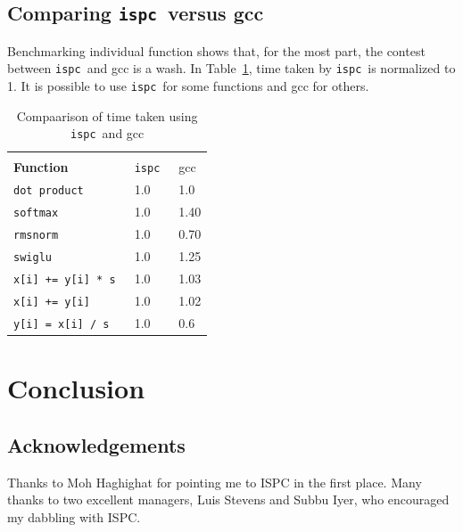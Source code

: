 \documentclass[letterpaper,12pt]{article}
\newcommand{\ISPC}{{\tt ispc}}
\begin{document}
\subsection{Comparing \ISPC\ versus gcc}
Benchmarking individual function shows that, for the most part, the contest
between \ISPC\ and gcc is a wash.
In Table~\ref{ispc_vs_gcc}, time taken by \ISPC\ is normalized to 1.
It is possible to use \ISPC\ for some functions and gcc for others.
\begin{table}
  \begin{tabular}{|l|l|l|} \hline \hline \\
    {\bf Function} & \ISPC\ & gcc \\ \hline \hline
    {\tt dot product} & 1.0 & 1.0 \\ \hline 
    {\tt softmax} & 1.0 & 1.40 \\ \hline 
    {\tt rmsnorm} & 1.0 & 0.70 \\ \hline 
    {\tt swiglu} & 1.0 & 1.25 \\ \hline 
\verb:x[i] += y[i] * s : & 1.0 & 1.03 \\ \hline
\verb:x[i] += y[i] : & 1.0 & 1.02 \\ \hline
\verb:y[i] = x[i] / s : & 1.0 & 0.6 \\ \hline
    \hline
    \end{tabular}
      \caption{Compaarison of time taken using \ISPC\ and gcc}
      \label{ispc_vs_gcc}
\end{table}

\section{Conclusion}


\subsection{Acknowledgements}

Thanks to Moh Haghighat for pointing me to ISPC in the first place. 
Many thanks to two excellent managers, Luis Stevens and Subbu Iyer, who
encouraged my dabbling with ISPC. 
\end{document}

